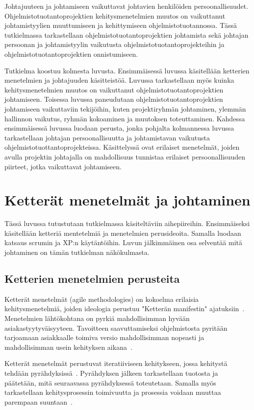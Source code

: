 \documentclass[finnish]{tktltiki2}
\theoremstyle{definition}
\theoremstyle{remark}
\begin{document}
Johtajuuteen ja johtamiseen vaikuttavat johtavien henkilöiden persoonallisuudet. Ohjelmistotuotantoprojektien kehitysmenetelmien muutos on vaikuttanut johtamistyylien muuttumiseen ja kehittymiseen ohjelmistotuotannossa. Tässä tutkielmassa tarkastellaan ohjelmistotuotantoprojektien johtamista sekä johtajan persoonan ja johtamistyylin vaikutusta ohjelmistotuotantoprojekteihin ja ohjelmistotuotantoprojektien onnistumiseen.

Tutkielma koostuu kolmesta luvusta. Ensimmäisessä luvussa käsitellään ketterien menetelmien ja johtajuuden käsitteistöä. Luvussa tarkastellaan myös kuinka kehitysmenetelmien muutos on vaikuttanut ohjelmistotuotantoprojektien johtamiseen. Toisessa luvussa paneudutaan ohjelmistotuotantoprojektien johtamiseen vaikuttaviin tekijöihin, kuten projektiryhmän johtaminen, ylemmän hallinnon vaikutus, ryhmän kokoaminen ja muutoksen toteuttaminen. Kahdessa ensimmäisessä luvussa luodaan perusta, jonka pohjalta kolmannessa luvussa tarkastellaan johtajan persoonallisuutta ja johtamistavan vaikutusta ohjelmistotuottantoprojekteissa. Käsittelyssä ovat erilaiset menetelmät, joiden avulla projektin johtajalla on mahdollisuus tunnistaa erilaiset persoonallisuuden piirteet, jotka vaikuttavat johtamiseen.  

\section{Ketterät menetelmät ja johtaminen}

Tässä luvussa tutustutaan tutkielmassa käsiteltäviin aihepiireihin. Ensimmäiseksi käsitellään ketteriä mentetelmiä ja menetelmien perusideoita. Samalla luodaan katsaus scrumin ja XP:n käytäntöihin. Luvun jälkimmäinen osa selventää mitä johtaminen on tämän tutkielman näkökulmasta.  


\subsection{Ketterien menetelmien perusteita}

Ketterät menetelmät (agile methodologies) on kokoelma erilaisia kehitysmenetelmiä, joiden ideologia perustuu "Ketterän manifestin" ajatuksiin~\cite{fowler2001agile}. Menetelmien lähtökohtana on pyrkiä mahdollisimman hyvään asiakastyytyväisyyteen. Tavoitteen saavuttamiseksi ohjelmistosta pyritään tarjoamaan asiakkaalle toimiva versio mahdollisimman nopeasti ja mahdollisimman usein kehityksen aikana~\cite{fowler2001agile}.

Ketterät menetelmät perustuvat iteratiiviseen kehitykseen, jossa kehitystä tehdään pyrähdyksissä~\cite{cohen2004introduction}. Pyrähdyksen jälkeen tarkastellaan tuotosta ja päätetään, mitä seuraavassa pyrähdyksessä toteutetaan. Samalla myös tarkastellaan kehitysprosessin toimivuutta ja prosessia voidaan muuttaa parempaan suuntaan~\cite{cohen2004introduction}.
\end{document}
